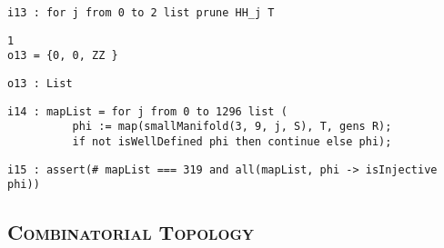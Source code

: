 \documentclass[12pt,leqno]{amsart}
\theoremstyle{definition}
\begin{document}
\begin{lstlisting}[xleftmargin=10pt, aboveskip=1.5pt, belowskip=1.5pt]
i13 : for j from 0 to 2 list prune HH_j T
\end{lstlisting}
\begin{lstlisting}[xleftmargin=10pt, lineskip=-10pt, aboveskip=4pt, belowskip=1.5pt]
               1
o13 = {0, 0, ZZ }
\end{lstlisting}
\begin{lstlisting}[xleftmargin=10pt, aboveskip=1.5pt, belowskip=1.5pt]
o13 : List
\end{lstlisting}
\begin{lstlisting}[xleftmargin=10pt, lineskip=-10pt, aboveskip=4pt, belowskip=1.5pt]
i14 : mapList = for j from 0 to 1296 list (
          phi := map(smallManifold(3, 9, j, S), T, gens R);
          if not isWellDefined phi then continue else phi);
\end{lstlisting}
\begin{lstlisting}[xleftmargin=10pt, aboveskip=1.5pt, belowskip=1.5pt]
i15 : assert(# mapList === 319 and all(mapList, phi -> isInjective phi))
\end{lstlisting}

\subsection*{\scshape\mdseries Combinatorial Topology}
\end{document}
